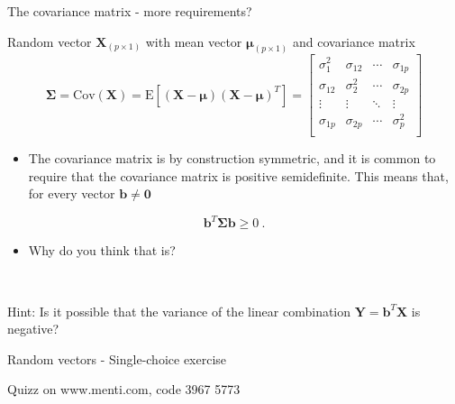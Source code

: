 \documentclass[
  ignorenonframetext,
]{beamer}
\providecommand{\tightlist}{%
  \setlength{\itemsep}{0pt}\setlength{\parskip}{0pt}}
\begin{document}
\begin{frame}
\begin{block}{The covariance matrix - more requirements?}
\protect\hypertarget{the-covariance-matrix---more-requirements}{}
\(~\)

Random vector \(\boldsymbol{X}_{(p\times 1)}\) with mean vector
\(\boldsymbol{\mu}_{(p\times 1)}\) and covariance matrix
\[\boldsymbol\Sigma=\text{Cov}(\boldsymbol{X})=\text{E}[(\boldsymbol{X}-\boldsymbol{\mu})(\boldsymbol{X}-\boldsymbol{\mu})^T]=
\left[ \begin{array}{cccc}
    \sigma_{1}^2 & \sigma_{12} & \cdots & \sigma_{1p}\\
    \sigma_{12} & \sigma_{2}^2 & \cdots & \sigma_{2p}\\
    \vdots & \vdots & \ddots & \vdots\\
    \sigma_{1p} & \sigma_{2p} & \cdots & \sigma_{p}^2\\
\end{array} \right]\]
\end{block}
\end{frame}

\begin{frame}
\begin{itemize}
\tightlist
\item
  The covariance matrix is by construction symmetric, and it is common
  to require that the covariance matrix is positive semidefinite. This
  means that, for every vector \(\boldsymbol{b}\neq \boldsymbol{0}\)
\end{itemize}

\[\boldsymbol{b}^T \boldsymbol{\Sigma} \boldsymbol{b} \geq 0 \ .\]

\begin{itemize}
\tightlist
\item
  Why do you think that is?
\end{itemize}

\(~\)

Hint: Is it possible that the variance of the linear combination
\(\boldsymbol{Y}=\boldsymbol{b}^T\boldsymbol{X}\) is negative?
\end{frame}

\begin{frame}
\begin{block}{Random vectors - Single-choice exercise}
\protect\hypertarget{random-vectors---single-choice-exercise}{}
\vspace{4mm}

Quizz on www.menti.com, code 3967 5773
\end{block}
\end{frame}
\end{document}
